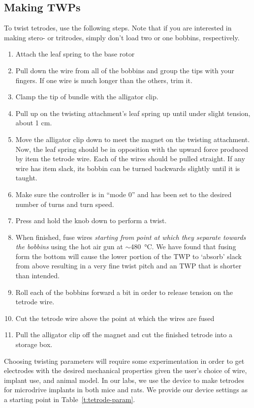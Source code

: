 \documentclass[11pt,a4paper]{article}
\begin{document}
\subsection{Making TWPs}
To twist tetrodes, use the following steps. Note that if you are interested in
making stero- or tritrodes, simply don't load two or one bobbins, respectively.

\begin{enumerate}[noitemsep]
    \item Attach the leaf spring to the base rotor
    \item Pull down the wire from all of the bobbins and group the tips with
        your fingers. If one wire is much longer than the others, trim it.
    \item Clamp the tip of bundle with the alligator clip.
    \item Pull up on the twisting attachment's leaf spring up until under
        slight tension, about 1 cm.
    \item Move the alligator clip down to meet the magnet on the twisting attachment.
        Now, the leaf spring should be in opposition with the upward force
        produced by item the tetrode wire. Each of the wires should be pulled
        straight. If any wire has item slack, its bobbin can be turned
        backwards slightly until it is taught.
    \item Make sure the controller is in ``mode 0'' and has been set to the
        desired number of turns and turn speed.
    \item Press and hold the knob down to perform a twist.
    \item When finished, fuse wires \textit{starting from point at which
        they separate towards the bobbins} using the hot air gun at
        $\sim$\SI{480}{\celsius}. We have found that fusing form the bottom will cause
        the lower portion of the TWP to `absorb' slack from above resulting in
        a very fine twist pitch and an TWP that is shorter than intended.
    \item Roll each of the bobbins forward a bit in order to release tension
        on the tetrode wire.
    \item Cut the tetrode wire above the point at which the wires are fused
    \item Pull the alligator clip off the magnet and cut the finished
        tetrode into a storage box.
\end{enumerate}

Choosing twisting parameters will require some experimentation in order to get
electrodes with the desired mechanical properties given the user's choice of
wire, implant use, and animal model. In our labs, we use the device to make
tetrodes for microdrive implants in both mice and rats. We provide our device
settings as a starting point in Table~\ref{t:tetrode-param}.
\end{document}
